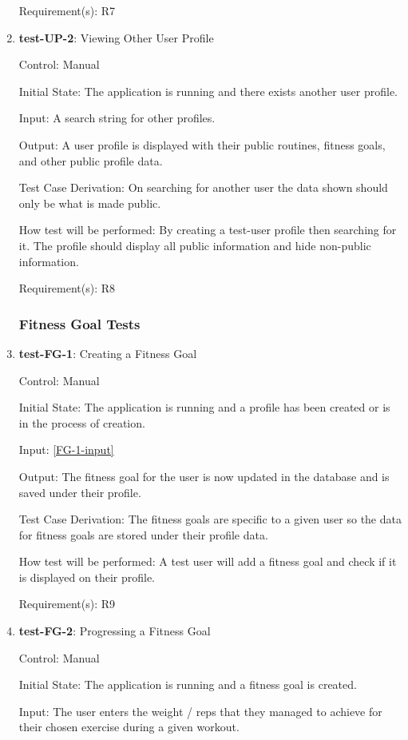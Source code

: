 \documentclass[12pt, titlepage]{article}
\begin{document}
\begin{enumerate}
		Requirement(s): R7
		
		\item{\textbf{test-UP-2}}: Viewing Other User Profile
		
		Control: Manual
		
		Initial State: The application is running and there exists another user profile.
		
		Input: A search string for other profiles.
		
		Output: A user profile is displayed with their public routines, fitness goals, and other public profile data.
		
		Test Case Derivation: On searching for another user the data shown should only be what is made public.
		
		How test will be performed: By creating a test-user profile then searching for it. The profile should display all public information and hide non-public information. 
		
		Requirement(s): R8
		
		\subsubsection{Fitness Goal Tests}
		
		\item{\textbf{test-FG-1}}: Creating a Fitness Goal
		
		Control: Manual
		
		Initial State: The application is running and a profile has been created or is in the process of creation.
		
		Input: \ref{FG-1-input}
		
		Output: The fitness goal for the user is now updated in the database and is saved under their profile.
		
		Test Case Derivation: The fitness goals are specific to a given user so the data for fitness goals are stored under their profile data.
		
		How test will be performed: A test user will add a fitness goal and check if it is displayed on their profile.
		
		Requirement(s): R9
		
		\item{\textbf{test-FG-2}}: Progressing a Fitness Goal
		
		Control: Manual
		
		Initial State: The application is running and a fitness goal is created.
		
		Input: The user enters the weight / reps that they managed to achieve for their chosen exercise during a given workout.
		

\end{enumerate}
\end{document}
